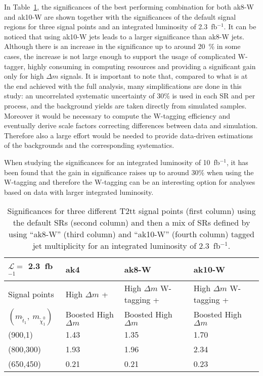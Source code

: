 In Table~\ref{tab:taggingResults}, the significances of the best performing combination  for both ak8-W and ak10-W are shown together with the significances of the default signal regions for three signal points and an integrated luminosity of 2.3~fb$^{-1}$. It can be noticed that using ak10-W jets leads to a larger significance than ak8-W jets. Although there is an increase in the significance up to around 20~\% in some cases, the increase is not large enough to support the usage of complicated W-tagger, highly consuming in computing resources and providing a significant gain only for high $\Delta m$ signals.  It is important to note that, compared to what is at the end achieved with the full analysis, many simplifications are done in this study: an uncorrelated systematic uncertainty of 30\% is used in each SR and per process, and the background yields are taken directly from simulated samples. Moreover it would be necessary to compute the W-tagging efficiency and eventually  derive scale factors correcting differences between data and simulation.  Therefore also a large effort would be needed to provide data-driven estimations of the backgrounds and the corresponding systematics. 

When studying the significances for an integrated luminosity of  10~fb$^{-1}$,  it has been found that the gain in significance raises up to around 30\% when using the W-tagging and therefore the W-tagging can be an interesting option for analyses based on data with larger integrated luminosity. 

\begin{table}[h]
\begin{center}
\begin{tabular}{|l|l|l|l|}
\hline
$\mathcal{L} =$ 2.3~fb$^{-1}$             & ak4~\cite{Sirunyan:2017xse}      & ak8-W & ak10-W \\
\hline
Signal points                       & High $\Delta m$ +           &  High $\Delta m$ W-tagging +  &   High $\Delta m$ W-tagging +  \\
$(m_{\tilde{t}_{1}},~m_{\tilde{\chi}^{0}_{1}})$    &  Boosted High $\Delta m$    & Boosted High $\Delta m$       &   Boosted High $\Delta m$  \\
\hline
\hline
(900,1) &     1.43 & 1.35 & 1.70  \\
\hline
(800,300) &   1.93 & 1.96 & 2.34  \\
\hline
(650,450) &   0.21 & 0.21 & 0.23  \\
\hline
\end{tabular}
\caption[Table caption text]{ Significances for three different T2tt signal points (first column) using the default SRs (second column) and then a mix of SRs defined by using ``ak8-W'' (third column) and ``ak10-W'' (fourth column) tagged jet multiplicity for an integrated luminosity of 2.3~fb$^{-1}$. }
\label{tab:taggingResults}
\end{center}
\end{table}

